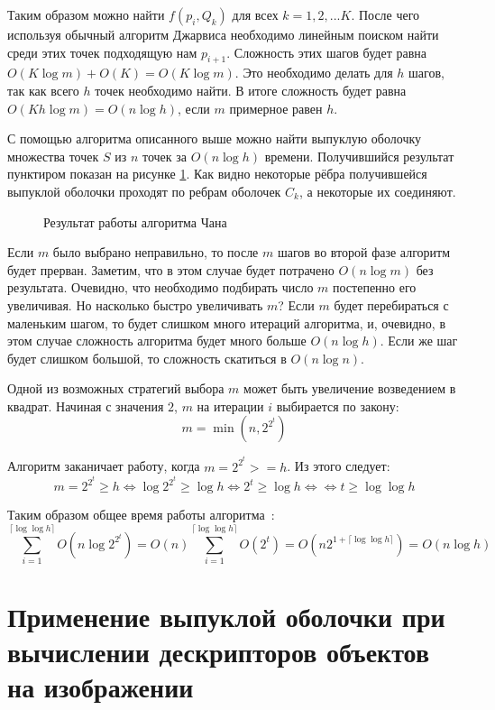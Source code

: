 Таким образом можно найти $f(p_i, Q_k)$ для всех $k=1,2,...K$. После чего используя обычный алгоритм Джарвиса необходимо линейным поиском найти среди этих точек подходящую нам $p_{i+1}$. Сложность этих шагов будет равна $O(K \log m) + O(K) = O(K \log m)$. Это необходимо делать для $h$ шагов, так как всего $h$ точек необходимо найти. В итоге сложность будет равна $O(K h \log m) = O(n \log h)$, если $m$ примерное равен $h$.

С помощью алгоритма описанного выше можно найти выпуклую оболочку множества точек $S$ из $n$ точек за $O(n \log h)$ времени. Получившийся результат пунктиром показан на рисунке \ref{img:chan_2}. Как видно некоторые рёбра получившейся выпуклой оболочки проходят по ребрам оболочек $C_k$, а некоторые их соединяют.

\begin{figure}
	\centering
	
	\caption{Результат работы алгоритма Чана}
	\label{img:chan_2}
\end{figure}

Если $m$ было выбрано неправильно, то после $m$ шагов во второй фазе алгоритм будет прерван. Заметим, что в этом случае будет потрачено $O(n \log m)$ без результата. Очевидно, что необходимо подбирать число $m$ постепенно его увеличивая. Но насколько быстро увеличивать $m$? Если $m$ будет перебираться с маленьким шагом, то будет слишком много итераций алгоритма, и, очевидно, в этом случае сложность алгоритма будет много больше $O(n \log h)$. Если же шаг будет слишком большой, то сложность скатиться в $O(n \log n)$.

Одной из возможных стратегий выбора $m$ может быть увеличение возведением в квадрат. Начиная с значения $2$, $m$ на итерации $i$ выбирается по закону:
\[
m = \min (n,2^{2^t})
\]

Алгоритм заканичает работу, когда $m = 2^{2^t} >= h$. Из этого следует:
\[
m = 2^{2^t} \geq h \iff \log 2^{2^t} \geq \log h \iff 2^t \geq \log h \iff \iff t \geq \log \log h
\]

Таким образом общее время работы алгоритма~\cite{wiki2018chan}:
\[
\sum_{i=1}^{\lceil \log \log h \rceil} O(n \log 2^{2^t}) = O(n) \sum_{i=1}^{\lceil \log \log h \rceil} O(2^t) = O(n 2^{1+\lceil \log \log h \rceil}) = O(n \log h)
\]

\section{Применение выпуклой оболочки при вычислении дескрипторов объектов на изображении}

